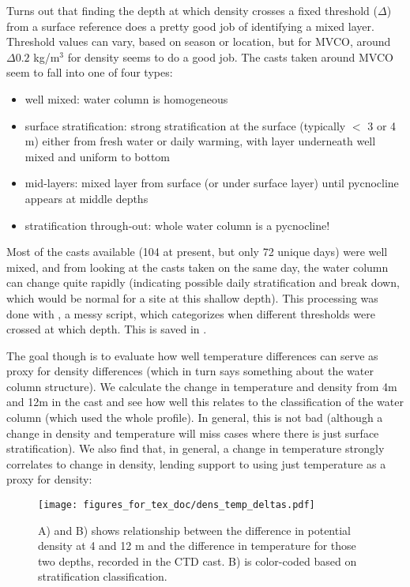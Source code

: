 \documentclass[11pt]{article}
\begin{document}
Turns out that finding the depth at which density crosses a fixed threshold ($\Delta$) from a surface reference does a pretty good job of identifying a mixed layer. Threshold values can vary, based on season or location, but for MVCO, around $\Delta0.2$ kg/m$^3$ for density seems to do a good job. The casts taken around MVCO seem to fall into one of four types:

\begin{itemize}

\item well mixed: water column is homogeneous
\item surface stratification: strong stratification at the surface (typically $<$ 3 or 4 m) either from fresh water or daily warming, with layer underneath well mixed and uniform to bottom
\item mid-layers: mixed layer from surface (or under surface layer) until pycnocline appears at middle depths 
\item stratification through-out: whole water column is a pycnocline!
\end{itemize}

Most of the casts available (104 at present, but only 72 unique days) were well mixed, and from looking at the casts taken on the same day, the water column can change quite rapidly (indicating possible daily stratification and break down, which would be normal for a site at this shallow depth). This processing was done with , a messy script, which categorizes when different thresholds were crossed at which depth. This is saved in .

 The goal though is to evaluate how well temperature differences can serve as proxy for density differences (which in turn says something about the water column structure). We calculate the change in temperature and density from 4m and 12m in the cast and see how well this relates to the classification of the water column (which used the whole profile). In general, this is not bad (although a change in density and temperature will miss cases where there is just surface stratification). We also find that, in general, a change in temperature strongly correlates to change in density, lending support to using just temperature as a proxy for density:

 \begin{figure}[h]
\centering
\texttt{[image: figures\_for\_tex\_doc/dens\_temp\_deltas.pdf]}
\caption{A) and B) shows relationship between the difference in potential density at 4 and 12 m and the difference in temperature for those two depths, recorded in the CTD cast. B) is color-coded based on stratification classification.}
\end{figure}
\end{document}
